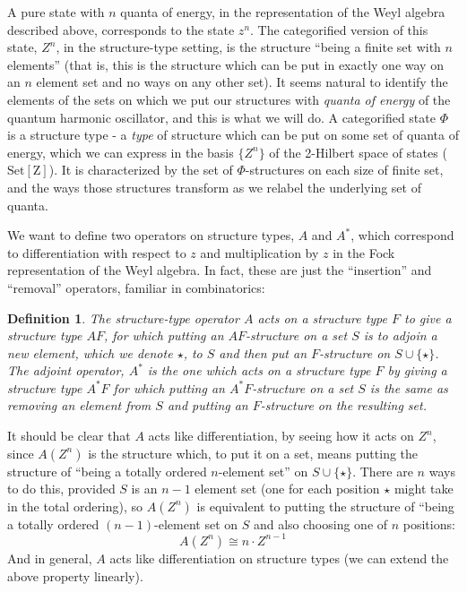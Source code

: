 \documentclass{amsart} \usepackage{amsmath,amssymb,bbm}
\newcommand{\opname}[1]{\operatorname{#1}}
\newtheorem{definition}{Definition}
\newcommand{\catname}[1]{\boldsymbol{\opname{{#1}}}}
\newcommand{\SetZ}{\catname{Set [ Z ]}}
\begin{document}
A pure state with $n$ quanta of energy, in the representation of the
Weyl algebra described above, corresponds to the state $z^n$.  The
categorified version of this state, $Z^n$, in the structure-type
setting, is the structure ``being a finite set with $n$ elements''
(that is, this is the structure which can be put in exactly one way on
an $n$ element set and no ways on any other set).  It seems natural to
identify the elements of the sets on which we put our structures with
\textit{quanta of energy} of the quantum harmonic oscillator, and this
is what we will do.  A categorified state $\Phi$ is a structure type -
a \textit{type} of structure which can be put on some set of quanta of
energy, which we can express in the basis $\{ Z^n \}$ of the 2-Hilbert
space of states ($\SetZ$).  It is characterized by the set of
$\Phi$-structures on each size of finite set, and the ways those
structures transform as we relabel the underlying set of quanta.

We want to define two operators on structure types, $A$ and
$A^{\ast}$, which correspond to differentiation with respect to $z$
and multiplication by $z$ in the Fock representation of the Weyl
algebra.  In fact, these are just the ``insertion'' and ``removal''
operators, familiar in combinatorics:

\begin{definition}\label{structladder}
  The structure-type operator $A$ acts on a structure type $F$ to give a
  structure type $A F$, for which putting an $A F$-structure on a set $S$ is
  to adjoin a new element, which we denote $\star$, to $S$ and then put an
  $F$-structure on $S \cup \{ \star \}$.  The adjoint operator, $A^{\ast}$ is
  the one which acts on a structure type $F$ by giving a structure type
  $A^{\ast} F$ for which putting an $A^{\ast} F$-structure on a set $S$ is the
  same as removing an element from $S$ and putting an $F$-structure on the
  resulting set.
\end{definition}

It should be clear that $A$ acts like differentiation, by seeing how
it acts on $Z^n$, since $A ( Z^n )$ is the structure which, to put it
on a set, means putting the structure of ``being a totally ordered
$n$-element set'' on $S \cup \{ \star \}$.  There are $n$ ways to do
this, provided $S$ is an $n - 1$ element set (one for each position
$\star$ might take in the total ordering), so $A ( Z^n )$ is
equivalent to putting the structure of ``being a totally ordered $( n
- 1 )$-element set on $S$ and also choosing one of $n$ positions:
\begin{equation}
  A ( Z^n ) \cong n \cdot Z^{n - 1}
\end{equation}
And in general, $A$ acts like differentiation on structure types (we can
extend the above property linearly).
\end{document}
